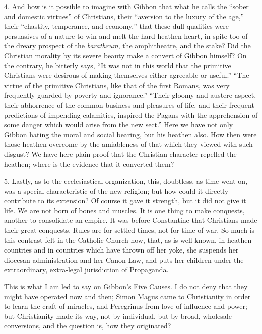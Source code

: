 4. And how is it possible to imagine with Gibbon that what he calls
the ``sober and domestic virtues'' of Christians, their
``aversion to the luxury of the age,'' their ``chastity,
temperance, and economy,'' that these dull qualities were
persuasives of a nature to win and melt the hard heathen heart, in
spite too of the dreary prospect of the \emph{barathrum}, the
amphitheatre, and the stake? Did the Christian morality by its severe
beauty make a convert of Gibbon himself? On the contrary, he bitterly
says, ``It was not in this world that the primitive Christians
were desirous of making themselves either agreeable or useful.''
``The virtue of the primitive Christians, like that of the first
Romans, was very frequently guarded by poverty and ignorance.''
``Their gloomy and austere aspect, their abhorrence of the common
business and pleasures of life, and their frequent predictions of
impending calamities, inspired the Pagans with the apprehension of
some danger which would arise from the new sect.'' Here we have
not only Gibbon hating the moral and social bearing, but his heathen
also. How then were those heathen overcome by the amiableness of that
which they viewed with such disgust? We have here plain proof that the
Christian character repelled the heathen; where is the evidence that
it converted them?

5. Lastly, as to the ecclesiastical organization, this, doubtless,
as time went on, was a special characteristic of the new religion; but
how could it directly contribute to its extension? Of course it gave
it strength, but it did not give it life. We are not born of bones and
muscles. It is one thing to make conquests, another to consolidate an
empire. It was before Constantine that Christians made their great
conquests. Rules are for settled times, not for time of war. So much
is this contrast felt in the Catholic Church now, that, as is well
known, in heathen countries and in countries which have thrown off her
yoke, she suspends her diocesan administration and her Canon Law, and
puts her children under the extraordinary, extra-legal jurisdiction of
Propaganda.

This is what I am led to say on Gibbon's Five Causes. I do not deny
that they might have operated now and then; Simon Magus came to
Christianity in order to learn the craft of miracles, and Peregrinus
from love of influence and power; but Christianity made its way, not
by individual, but by broad, wholesale conversions, and the question
is, how they originated?

